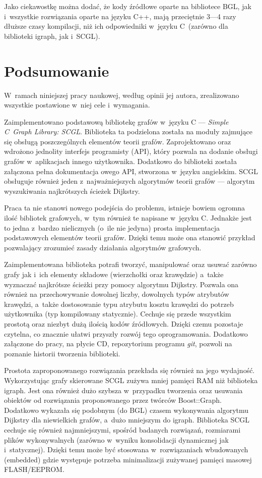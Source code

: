 \documentclass[a4paper,12pt,polish,twoside,openright]{thesis}
\begin{document}
Jako ciekawostkę można dodać, że kody źródłowe oparte na bibliotece BGL, jak i~wszystkie rozwiązania oparte na języku C++, mają przeciętnie 3---4 razy dłuższe czasy kompilacji, niż ich odpowiedniki w~języku C~(zarówno dla biblioteki igraph, jak i~SCGL).


\chapter*{Podsumowanie}
W~ramach niniejszej pracy naukowej, według opinii jej autora, zrealizowano wszystkie postawione w~niej cele i~wymagania.

Zaimplementowano podstawową bibliotekę grafów w~języku C --- \emph{Simple C~Graph Library: SCGL}.
Biblioteka ta podzielona została na moduły zajmujące się obsługą poszczególnych elementów teorii grafów.
Zaprojektowano oraz wdrożono jednolity interfejs programisty (API), który pozwala na dodanie obsługi grafów w~aplikacjach innego użytkownika.
Dodatkowo do biblioteki została załączona pełna dokumentacja owego API, stworzona w~języku angielskim.
SCGL obsługuje również jeden z~najważniejszych algorytmów teorii grafów --- algorytm wyszukiwania najkrótszych ścieżek Dijkstry.

Praca ta nie stanowi nowego podejścia do problemu, istnieje bowiem ogromna ilość bibliotek grafowych, w~tym również te napisane w~języku C. Jednakże jest to jedna z~bardzo nielicznych (o~ile nie jedyna) prosta implementacja podstawowych elementów teorii grafów. Dzięki temu może ona stanowić przykład pozwalający zrozumieć zasady działania algorytmów grafowych.

Zaimplementowana biblioteka potrafi tworzyć, manipulować oraz usuwać zarówno grafy jak i~ich elementy składowe (wierzchołki oraz krawędzie) a~także wyznaczać najkrótsze ścieżki przy pomocy algorytmu Dijkstry.
Pozwala ona również na przechowywanie dowolnej liczby, dowolnych typów atrybutów krawędzi, a~także dostosowanie typu atrybutu kosztu krawędzi do potrzeb użytkownika (typ kompilowany statycznie).
Cechuje się przede wszystkim prostotą oraz niezbyt dużą ilością kodów źródłowych.
Dzięki czemu pozostaje czytelna, co znacznie ułatwi przyszły rozwój tego oprogramowania.
Dodatkowo załączone do pracy, na płycie CD, repozytorium programu \emph{git}, pozwoli na poznanie historii tworzenia biblioteki.

Prostota zaproponowanego rozwiązania przekłada się również na jego wydajność.
Wykorzystując grafy skierowane SCGL zużywa mniej pamięci RAM niż biblioteka igraph.
Jest ona również dużo szybsza w~przypadku tworzenia oraz usuwania obiektów od rozwiązania proponowanego przez twórców Boost::Graph.
Dodatkowo wykazała się podobnym (do BGL) czasem wykonywania algorytmu Dijkstry dla niewielkich grafów, a~dużo mniejszym do igraph.
Biblioteka SCGL cechuje się również najmniejszymi, spośród badanych rozwiązań, rozmiarami plików wykonywalnych (zarówno w~wyniku konsolidacji dynamicznej jak i~statycznej).
Dzięki temu może być stosowana w~rozwiązaniach wbudowanych (embedded) gdzie występuje potrzeba minimalizacji zużywanej pamięci masowej FLASH/EEPROM.
\end{document}

